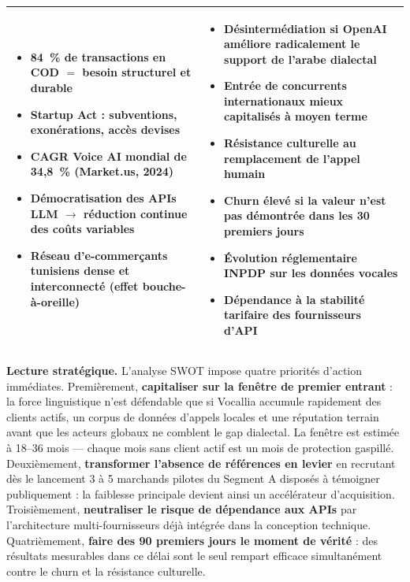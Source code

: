 \begin{table}[H]
\begin{tabularx}{\textwidth}{|>{\raggedright\arraybackslash}X|>{\raggedright\arraybackslash}X|}
\begin{itemize}[leftmargin=*, noitemsep, topsep=3pt, parsep=0pt]
  \item 84~\% de transactions en COD $=$ besoin structurel et durable
  \item Startup Act : subventions, exonérations, accès devises
  \item CAGR Voice AI mondial de 34,8~\% (Market.us, 2024)
  \item Démocratisation des APIs LLM $\rightarrow$ réduction continue des coûts variables
  \item Réseau d'e-commerçants tunisiens dense et interconnecté (effet bouche-à-oreille)
\end{itemize}
&
\begin{itemize}[leftmargin=*, noitemsep, topsep=3pt, parsep=0pt]
  \item Désintermédiation si OpenAI améliore radicalement le support de l'arabe dialectal
  \item Entrée de concurrents internationaux mieux capitalisés à moyen terme
  \item Résistance culturelle au remplacement de l'appel humain
  \item Churn élevé si la valeur n'est pas démontrée dans les 30 premiers jours
  \item Évolution réglementaire INPDP sur les données vocales
  \item Dépendance à la stabilité tarifaire des fournisseurs d'API
\end{itemize} \\
\hline
\end{tabularx}
\end{table}


\medskip
\noindent\textbf{Lecture stratégique.} L'analyse SWOT impose quatre priorités d'action immédiates. Premièrement, \textbf{capitaliser sur la fenêtre de premier entrant} : la force linguistique n'est défendable que si Vocallia accumule rapidement des clients actifs, un corpus de données d'appels locales et une réputation terrain avant que les acteurs globaux ne comblent le gap dialectal. La fenêtre est estimée à 18--36 mois --- chaque mois sans client actif est un mois de protection gaspillé. Deuxièmement, \textbf{transformer l'absence de références en levier} en recrutant dès le lancement 3 à 5 marchands pilotes du Segment A disposés à témoigner publiquement : la faiblesse principale devient ainsi un accélérateur d'acquisition. Troisièmement, \textbf{neutraliser le risque de dépendance aux APIs} par l'architecture multi-fournisseurs déjà intégrée dans la conception technique. Quatrièmement, \textbf{faire des 90 premiers jours le moment de vérité} : des résultats mesurables dans ce délai sont le seul rempart efficace simultanément contre le churn et la résistance culturelle.

